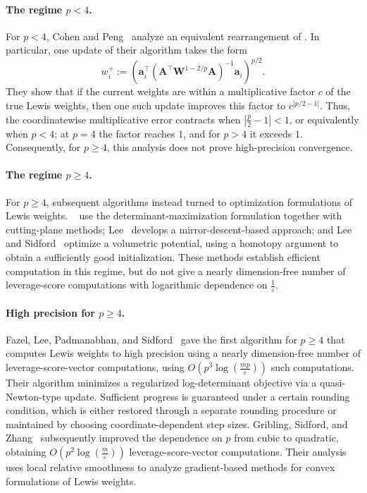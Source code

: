 \documentclass[11pt]{article}
\theoremstyle{plain}
\numberwithin{equation}{section}
\newcommand{\eps}{\varepsilon}
\newcommand{\bA}{\mathbf{A}}
\newcommand{\bW}{\mathbf{W}}
\newcommand{\ba}{\mathbf{a}}
\begin{document}
\paragraph{The regime $p<4$.}
For $p<4$, Cohen and Peng~\cite{cohen2015lp} analyze an equivalent rearrangement of . 
In particular, one update of their algorithm takes the form
\[
w_i^+
:=
\left(
\ba_i^\top
\left(\bA^\top\bW^{1-2/p}\bA\right)^{-1}
\ba_i
\right)^{p/2}.
\]
They show that if the current weights are within a multiplicative factor $c$ of the true Lewis weights, then one such update improves this factor to $c^{|p/2-1|}$. 
Thus, the coordinatewise multiplicative error contracts when $|\frac{p}{2}-1|<1$, or equivalently when $p<4$; at $p=4$ the factor reaches $1$, and for $p>4$ it exceeds $1$. 
Consequently, for $p\geq4$, this analysis does not prove high-precision convergence.

\paragraph{The regime $p\geq4$.} 
For $p\geq4$, subsequent algorithms instead turned to optimization formulations of Lewis weights. 
~\cite{cohen2015lp} use the determinant-maximization formulation together with cutting-plane methods; Lee~\cite{lee2016faster} develops a mirror-descent-based approach; and Lee and Sidford~\cite{lee2019solving} optimize a volumetric potential, using a homotopy argument to obtain a sufficiently good initialization. 
These methods establish efficient computation in this regime, but do not give a nearly dimension-free number of leverage-score computations with logarithmic dependence on $\frac{1}{\eps}$.

\paragraph{High precision for $p\geq4$.} 
Fazel, Lee, Padmanabhan, and Sidford~\cite{fazel2022computing} gave the first algorithm for $p\geq4$ that computes Lewis weights to high precision using a nearly dimension-free number of leverage-score-vector computations, using
$O\left(p^3\log\left(\frac{mp}{\eps}\right)\right)$
such computations. 
Their algorithm minimizes a regularized log-determinant objective via a quasi-Newton-type update. 
Sufficient progress is guaranteed under a certain rounding condition, which is either restored through a separate rounding procedure or maintained by choosing coordinate-dependent step sizes. 
Gribling, Sidford, and Zhang~\cite{pmlr-v336-gribling26a} subsequently improved the dependence on $p$ from cubic to quadratic, obtaining
$O\left(p^2\log\left(\frac{m}{\eps}\right)\right)$
leverage-score-vector computations. 
Their analysis uses local relative smoothness to analyze gradient-based methods for convex formulations of Lewis weights.
\end{document}
